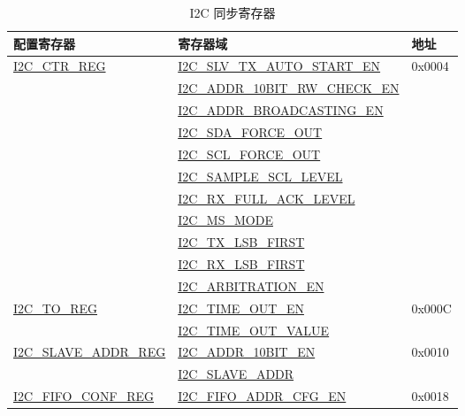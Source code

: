\documentclass[main\_\_CN.tex]{subfiles}
\begin{document}
\begin{longtable}{ | p{6cm} | p{7cm} | p{2cm} | }
\caption{I2C 同步寄存器}\label{tab:i2c-sync-register}\\\hline
\rowcolor{lightgray}
配置寄存器& 寄存器域 & 地址  \\ \hline
\hyperref[regdesc:I2CCTRREG]{I2C\_CTR\_REG} & {\hyperref[fielddesc:I2CSLVTXAUTOSTARTEN]{I2C\_SLV\_TX\_AUTO\_START\_EN}} & 0x0004  \\\cline{2-2}

& {\hyperref[fielddesc:I2CADDR10BITRWCHECKEN]{I2C\_ADDR\_10BIT\_RW\_CHECK\_EN}}& \\\cline{2-2}
& {\hyperref[fielddesc:I2CADDRBROADCASTINGEN]{I2C\_ADDR\_BROADCASTING\_EN}}& \\\cline{2-2}
& {\hyperref[fielddesc:I2CSDAFORCEOUT]{I2C\_SDA\_FORCE\_OUT}}& \\\cline{2-2}
& {\hyperref[fielddesc:I2CSCLFORCEOUT]{I2C\_SCL\_FORCE\_OUT}}& \\\cline{2-2}
& {\hyperref[fielddesc:I2CSAMPLESCLLEVEL]{I2C\_SAMPLE\_SCL\_LEVEL}}& \\\cline{2-2}
& {\hyperref[fielddesc:I2CRXFULLACKLEVEL]{I2C\_RX\_FULL\_ACK\_LEVEL}}& \\\cline{2-2}
& {\hyperref[fielddesc:I2CMSMODE]{I2C\_MS\_MODE}}& \\\cline{2-2}
& {\hyperref[fielddesc:I2CTXLSBFIRST]{I2C\_TX\_LSB\_FIRST}}& \\\cline{2-2}
& {\hyperref[fielddesc:I2CRXLSBFIRST]{I2C\_RX\_LSB\_FIRST}}& \\\cline{2-2}
& {\hyperref[fielddesc:I2CARBITRATIONEN]{I2C\_ARBITRATION\_EN}}& \\ \hline

\hyperref[regdesc:I2CTOREG]{I2C\_TO\_REG} & {\hyperref[fielddesc:I2CTIMEOUTEN]{I2C\_TIME\_OUT\_EN}} & 0x000C  \\\cline{2-2}
& {\hyperref[fielddesc:I2CTIMEOUTVALUE]{I2C\_TIME\_OUT\_VALUE}}& \\ \hline

\hyperref[regdesc:I2CSLAVEADDRREG]{I2C\_SLAVE\_ADDR\_REG} & {\hyperref[fielddesc:I2CADDR10BITEN]{I2C\_ADDR\_10BIT\_EN}} & 0x0010 \\\cline{2-2}
& {\hyperref[fielddesc:I2CSLAVEADDR]{I2C\_SLAVE\_ADDR}}& \\ \hline


\hyperref[regdesc:I2CFIFOCONFREG]{I2C\_FIFO\_CONF\_REG} & {\hyperref[fielddesc:I2CFIFOADDRCFGEN]{I2C\_FIFO\_ADDR\_CFG\_EN}} & 0x0018 \\ \hline


\end{longtable}
\end{document}
